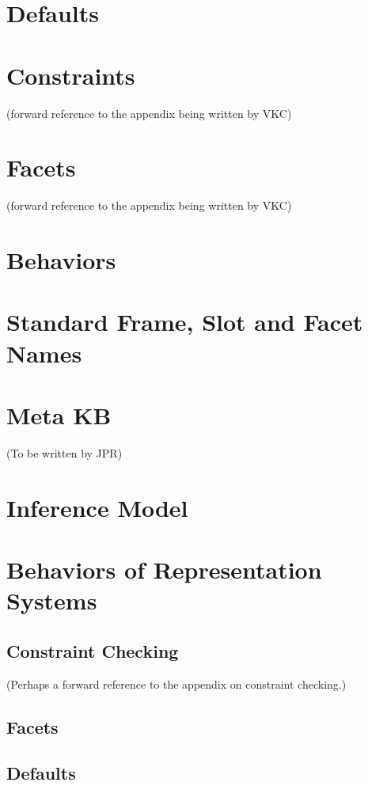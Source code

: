 \section{Defaults}

\section{Constraints}
(forward reference to the appendix being written by VKC)

\section{Facets}
(forward reference to the appendix being written by VKC)

\section{Behaviors}

\section{Standard Frame, Slot and Facet Names}

\section{Meta KB}
(To be written by JPR)

\section{Inference Model} 

\section{Behaviors of Representation Systems}

\subsection{Constraint Checking}
(Perhaps a forward reference to the appendix on constraint checking.)

\subsection{Facets}

\subsection{Defaults}

